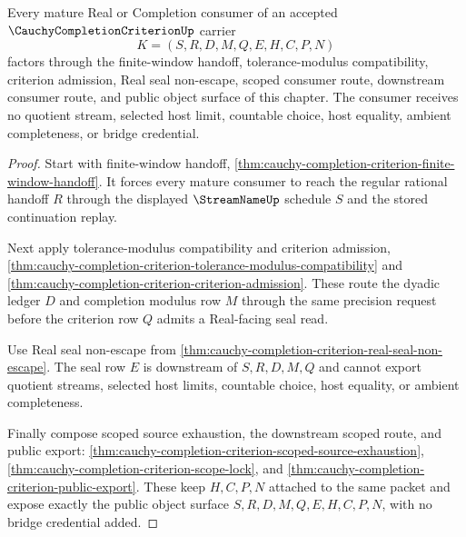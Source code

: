 \begin{theorem}
\label{thm:cauchy-completion-criterion-mature-consumer-route}
Every mature Real or Completion consumer of an accepted $\CauchyCompletionCriterionUp$ carrier
$$
K=(S,R,D,M,Q,E,H,C,P,N)
$$
factors through the finite-window handoff, tolerance-modulus compatibility, criterion admission, Real seal non-escape, scoped consumer route, downstream consumer route, and public object surface of this chapter. The consumer receives no quotient stream, selected host limit, countable choice, host equality, ambient completeness, or bridge credential.
\end{theorem}
\begin{proof}
Start with finite-window handoff, \autoref{thm:cauchy-completion-criterion-finite-window-handoff}. It forces every mature consumer to reach the regular rational handoff $R$ through the displayed $\StreamNameUp$ schedule $S$ and the stored continuation replay.

Next apply tolerance-modulus compatibility and criterion admission, \autoref{thm:cauchy-completion-criterion-tolerance-modulus-compatibility} and \autoref{thm:cauchy-completion-criterion-criterion-admission}. These route the dyadic ledger $D$ and completion modulus row $M$ through the same precision request before the criterion row $Q$ admits a Real-facing seal read.

Use Real seal non-escape from \autoref{thm:cauchy-completion-criterion-real-seal-non-escape}. The seal row $E$ is downstream of $S,R,D,M,Q$ and cannot export quotient streams, selected host limits, countable choice, host equality, or ambient completeness.

Finally compose scoped source exhaustion, the downstream scoped route, and public export: \autoref{thm:cauchy-completion-criterion-scoped-source-exhaustion}, \autoref{thm:cauchy-completion-criterion-scope-lock}, and \autoref{thm:cauchy-completion-criterion-public-export}. These keep $H,C,P,N$ attached to the same packet and expose exactly the public object surface $S,R,D,M,Q,E,H,C,P,N$, with no bridge credential added.
\end{proof}


